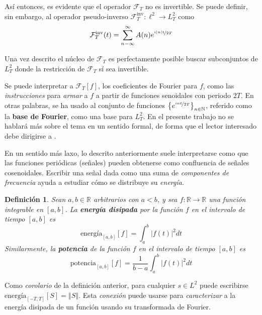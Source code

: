 \documentclass[12pt,letterpaper]{book}
\newtheorem{definicion}{Definición}[chapter]
\newcommand{\R}{\mathbb{R}}
\newcommand{\N}{\mathbb{N}}
\newcommand{\abso}[1]{\left| #1 \right|}
\newcommand{\norma}[1]{\left\Vert #1 \right\Vert}
\begin{document}
Así entonces, es evidente que el operador $\mathcal{F}_T$ no es invertible.
%
Se puede definir, sin embargo, al operador pseudo-inverso $\mathcal{F}_{T}^{\text{inv}} : \ell^{2} \rightarrow L^{2}_T$ como
\begin{equation}
\mathcal{F}_{T}^{\text{inv}}(t) = \sum_{n -\infty}^{\infty} A(n) e^{\nicefrac{i \abso{n} t}{2 T}}
\end{equation}

Una vez descrito el núcleo de $\mathcal{F}_{T}$ es perfectamente posible buscar subconjuntos de $L^{2}_T$ donde la restricción de $\mathcal{F}_{T}$ sí sea invertible.

Se puede interpretar a $\mathcal{F}_{T}[f]$, los coeficientes de Fourier para $f$, como las \textit{instrucciones} para \textit{armar} a $f$ a partir de funciones senoidales con periodo $2T$.
%
En otras palabras, se ha usado al conjunto de funciones $\left\{ e^{\nicefrac{i {n} t}{2 T}} \right\}_{n\in \N}$, referido como la \textbf{base de Fourier}, como una base para $L^{2}_T$.
%
En el presente trabajo no se hablará más sobre el tema en un sentido formal, de forma que el lector interesado debe dirigirse a \cite{estacionariedad_lindgren}.%

En un sentido más laxo, lo descrito anteriormente suele interpretarse como que las funciones periódicas (señales) pueden obtenerse como confluencia de señales cosenoidales.
%
Escribir una señal dada como una suma de \textit{componentes de frecuencia} ayuda a estudiar cómo se distribuye su \textit{energía}.

\begin{definicion}
Sean $a,b \in \R$ arbitrarios con $a<b$, y sea $f: \R \rightarrow \R$ una función integrable en $[a,b]$. La \textbf{energía disipada} por la función $f$ en el intervalo de tiempo $[a,b]$ es
\begin{equation}
\text{energía}_{[a,b]}[f] = \int_a^{b} \abso{f(t)}^{2} dt
\end{equation}
Similarmente, la \textbf{potencia} de la función $f$ en el intervalo de tiempo $[a,b]$ es
\begin{equation}
\text{potencia}_{[a,b]}[f] = \frac{1}{b-a} \int_a^{b} \abso{f(t)}^{2} dt
\end{equation}
\label{lazy5}
\end{definicion}

Como \textit{corolario} de la definición anterior, para cualquier $s\in L^{2}$ puede escribirse $\text{energía}_{[-T,T]}[S] = \norma{S}$.
%
Esta \textit{conexión} puede usarse para \textit{caracterizar} a la energía disipada de un función usando su transformada de Fourier.
\end{document}
